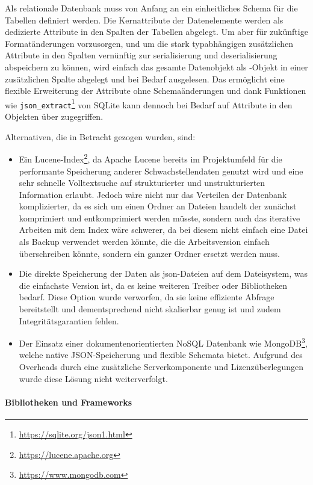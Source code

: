 Als relationale Datenbank muss von Anfang an ein einheitliches Schema für die Tabellen definiert werden.
Die Kernattribute der Datenelemente werden als dedizierte Attribute in den Spalten der Tabellen abgelegt.
Um aber für zukünftige Formatänderungen vorzusorgen, und um die stark typabhängigen zusätzlichen Attribute in den Spalten vernünftig zur serialisierung und deserialisierung abspeichern zu können, wird einfach das gesamte Datenobjekt als -Objekt in einer zusätzlichen Spalte abgelegt und bei Bedarf ausgelesen.
Das ermöglicht eine flexible Erweiterung der Attribute ohne Schemaänderungen und dank Funktionen wie \texttt{json\_extract}\footnote{\url{https://sqlite.org/json1.html}} von SQLite kann dennoch bei Bedarf auf Attribute in den Objekten über  zugegriffen.

Alternativen, die in Betracht gezogen wurden, sind:

\begin{itemize}
    \itemsep0em
    \item Ein Lucene-Index\footnote{\url{https://lucene.apache.org}}, da Apache Lucene bereits im Projektumfeld für die performante Speicherung anderer Schwachstellendaten genutzt wird und eine sehr schnelle Volltextsuche auf strukturierter und unstrukturierten Information erlaubt.
    Jedoch wäre nicht nur das Verteilen der Datenbank komplizierter, da es sich um einen Ordner an Dateien handelt der zunächst komprimiert und entkomprimiert werden müsste, sondern auch das iterative Arbeiten mit dem Index wäre schwerer, da bei diesem nicht einfach eine Datei als Backup verwendet werden könnte, die die Arbeitsversion einfach überschreiben könnte, sondern ein ganzer Ordner ersetzt werden muss.
    \item Die direkte Speicherung der Daten als \acrshort{json}-Dateien auf dem Dateisystem, was die einfachste Version ist, da es keine weiteren Treiber oder Bibliotheken bedarf.
    Diese Option wurde verworfen, da sie keine effiziente Abfrage bereitstellt und dementsprechend nicht skalierbar genug ist und zudem Integritätsgarantien fehlen.
    \item Der Einsatz einer dokumentenorientierten NoSQL Datenbank wie MongoDB\footnote{\url{https://www.mongodb.com}}, welche native JSON-Speicherung und flexible Schemata bietet.
    Aufgrund des Overheads durch eine zusätzliche Serverkomponente und Lizenzüberlegungen wurde diese Lösung nicht weiterverfolgt.
\end{itemize}

\paragraph{Bibliotheken und Frameworks}

